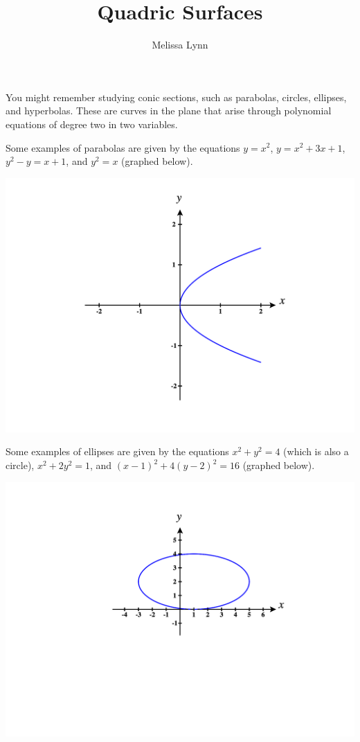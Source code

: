 \documentclass{ximera}
\title{Quadric Surfaces}
\author{Melissa Lynn}
\begin{document}
\begin{abstract}
\end{abstract}
\maketitle


You might remember studying conic sections, such as parabolas, circles, ellipses, and hyperbolas. These are curves in the plane that arise through polynomial equations of degree two in two variables.

Some examples of parabolas are given by the equations $y=x^2$, $y=x^2+3x+1$, $y^2-y=x+1$, and $y^2=x$ (graphed below).

\begin{image}
\includegraphics[width = \textwidth]{CalcPlot3D-parabola}
\end{image}

Some examples of ellipses are given by the equations $x^2+y^2=4$ (which is also a circle), $x^2+2y^2=1$, and $(x-1)^2+4(y-2)^2=16$ (graphed below).

\begin{image}
\includegraphics[width = \textwidth]{CalcPlot3D-ellipse}
\end{image}
\end{document}
